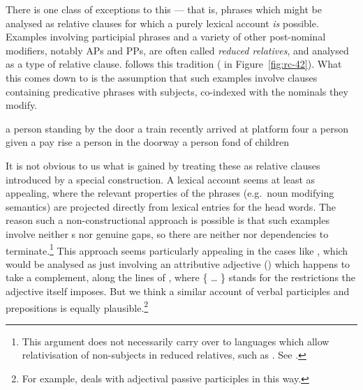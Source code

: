 \documentclass[output=paper
 	        ,biblatex
                ,babelshorthands
                ,newtxmath
                ,draftmode
                ,colorlinks, citecolor=brown
]{langscibook}
\begin{document}
There is one class of exceptions to this --- that is, phrases which might be analysed as
relative clauses for
which a purely lexical account \emph{is} possible. Examples involving participial phrases
and a variety of other post-nominal modifiers, notably APs and PPs, are often called
\emph{reduced relatives}, and analysed as a type of relative clause.  \citet[471]{Sag:97}
follows this tradition ( in Figure~\ref{fig:rc-42}). What this comes down to is the assumption that such examples
involve clauses containing predicative phrases with  subjects, co-indexed with
the nominals they modify. 
\begin{exe}\ex\begin{xlist}\label{x:rc-99}
  \settowidth{}
  \ex\label{x:rc-100} a person standing by the door 
  \ex\label{x:rc-101} a train recently arrived at platform four 
  \ex\label{x:rc-102} a person given a pay rise 
  \ex\label{x:rc-103} a person in the doorway
  \ex\label{x:rc-104} a person fond of children
\end{xlist}\end{exe}
It is not obvious to us what is gained by treating these as relative clauses introduced by
a special construction. A lexical account seems at least as appealing, where the relevant
properties of the phrases (e.g.\ noun modifying semantics) are projected directly from
lexical entries for the head words. The reason such a non-constructional approach is
possible is that such examples involve neither s nor genuine gaps, so
there are neither  nor  dependencies to terminate.\footnote{This
  argument does not necessarily carry over to languages which allow relativisation of
  non-subjects in reduced relatives, such as . See .
}
This
approach seems particularly appealing in the cases like , which would be
analysed as just involving an attributive adjective () which happens to take a
complement, along the lines of , where \{ \ldots{} \} stands for the restrictions
the adjective itself imposes. But we think a similar account of verbal
participles and prepositions is equally plausible.\footnote{For example, \citet[159--164]{Mueller2002b} deals with
adjectival passive participles in this way.}
\begin{exe}\ex\label{x:rc-105}
\end{exe}
\end{document}
